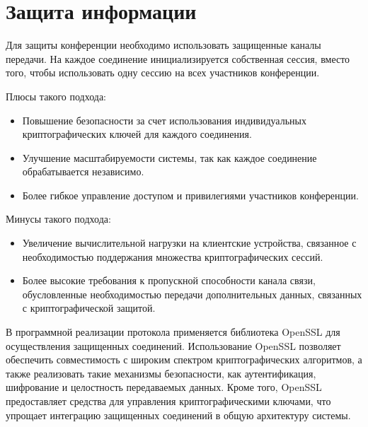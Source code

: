 \section{Защита информации}

Для защиты конференции необходимо использовать защищенные каналы передачи. На каждое соединение инициализируется собственная сессия, вместо того, чтобы использовать одну сессию на всех участников конференции.

Плюсы такого подхода:
\begin{itemize}[label=---]
  \item Повышение безопасности за счет использования индивидуальных криптографических ключей для каждого соединения.
  \item Улучшение масштабируемости системы, так как каждое соединение обрабатывается независимо.
  \item Более гибкое управление доступом и привилегиями участников конференции.
\end{itemize}

Минусы такого подхода:
\begin{itemize}[label=---]
  \item Увеличение вычислительной нагрузки на клиентские устройства, связанное с необходимостью поддержания множества криптографических сессий.
  \item Более высокие требования к пропускной способности канала связи, обусловленные необходимостью передачи дополнительных данных, связанных с криптографической защитой.
\end{itemize}

В программной реализации протокола применяется библиотека OpenSSL \cite{openssl} для осуществления защищенных соединений. Использование OpenSSL позволяет обеспечить совместимость с широким спектром криптографических алгоритмов, а также реализовать такие механизмы безопасности, как аутентификация, шифрование и целостность передаваемых данных. Кроме того, OpenSSL предоставляет средства для управления криптографическими ключами, что упрощает интеграцию защищенных соединений в общую архитектуру системы.
